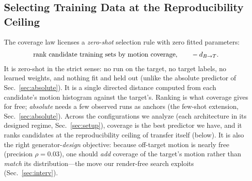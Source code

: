 \subsection{Selecting Training Data at the Reproducibility Ceiling}
\label{sec:predict}

The coverage law licenses a \emph{zero-shot} selection rule with zero fitted
parameters:
\begin{equation}
\text{rank candidate training sets by motion coverage,}\qquad -d_{B\to T} .
\label{eq:rule}
\end{equation}
It is zero-shot in the strict sense: no run on the target, no target labels, no
learned weights, and nothing fit and held out (unlike the absolute predictor of
Sec.~\ref{sec:absolute}). It is a single directed distance computed from each
candidate's motion histogram against the target's.
Ranking is what coverage gives for free; \emph{absolute} \pck{} needs a few
observed runs as anchors (the few-shot extension, Sec.~\ref{sec:absolute}).
Across the configurations we analyze (each architecture in its designed regime,
Sec.~\ref{sec:setup}), coverage is the best predictor we have, and it ranks
candidates at the reproducibility ceiling of transfer itself (below). It is also
the right generator-\emph{design} objective: because off-target motion is nearly
free (precision $\rho{=}0.03$), one should \emph{add} coverage of the target's
motion rather than \emph{match} its distribution---the move our render-free
search exploits (Sec.~\ref{sec:interv}).

\begin{table}[t]
\centering
\caption{\textbf{The same five distances, in motion and in appearance, with
selection regret.} Within-context Spearman $\rho$ between peak transfer and each
(negated) distance, on the design-defined configurations (each architecture in its
intended regime, Sec.~\ref{sec:setup}), split into real-motion and semantic
targets and pooled (``all''). The five distances---two directed (coverage/recall
$\dbt$, off-target/precision $\dtb$), the symmetric mean-NN, and two distribution
distances (sliced Wasserstein-2, FID)---are computed in motion (BFV) and
appearance (DINO) space, so appearance gets the same battery as motion. Motion
coverage (\textbf{bold}) is the best predictor in every motion column; every
appearance distance is null-to-wrong-signed, the target-selective signal living in
motion. The final column is \emph{selection regret}: the median peak \pck{} given
up versus an oracle that always picks the best source (fit-free, lower better).
Ranking by coverage loses a median $0.6$ \pck; the symmetric and distribution
distances lose more, off-target and appearance far more, and a random pick
$15.1$. Each $\rho$ is a within-context rank correlation over $n{\approx}11$
candidate sources per context, pooled across contexts.}
\label{tab:predictors}
\small
\setlength{\tabcolsep}{3pt}

\end{table}

